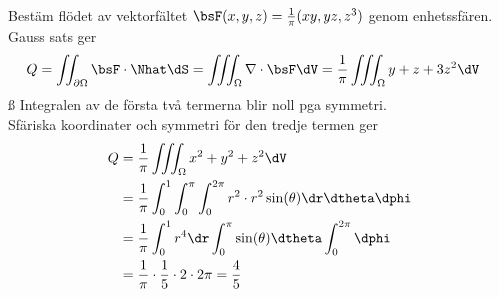 Bestäm flödet av vektorfältet $\bsF(x, y, z) = \frac{1}{\pi} (xy, yz, z^3)$
genom enhetssfären.
Gauss sats ger
\begin{align*}
  Q = \iint_{\partial\Omega} \bsF \cdot \Nhat \dS
  &= \iiint_{\Omega} \nabla \cdot \bsF \dV
    = \frac{1}{\pi} \iiint_{\Omega} y + z + 3z^2 \dV
\end{align*}ß
Integralen av de första två termerna blir noll pga symmetri. \\
Sfäriska koordinater och symmetri för den tredje termen ger
\begin{align*}
  Q &= \frac{1}{\pi} \iiint_{\Omega} x^2 + y^2 + z^2 \dV \\
    &= \frac{1}{\pi} \int_0^1 \int_0^{\pi} \int_0^{2\pi} r^2 \cdot
      r^2\sin(\theta)\dr\dtheta\dphi \\
    &= \frac{1}{\pi} \int_0^1 r^4 \dr \int_0^{\pi} \sin(\theta)
      \dtheta \int_0^{2\pi} \dphi \\
    &= \frac{1}{\pi} \cdot \frac{1}{5} \cdot 2 \cdot 2\pi
     = \frac{4}{5}
\end{align*}
%